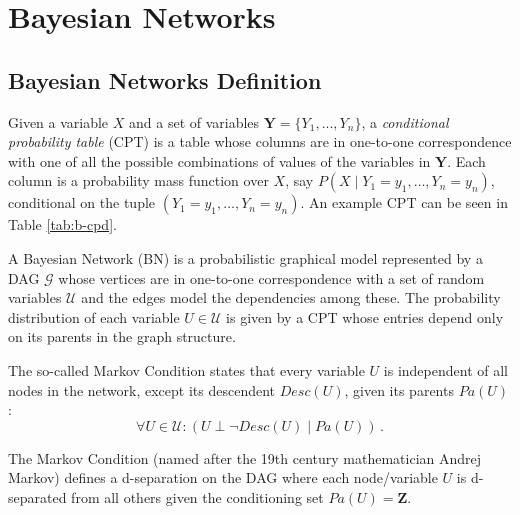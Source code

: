 \section{Bayesian Networks} \label{sec:bayesiannetworks}
\subsection{Bayesian Networks Definition}
Given a variable $X$ and a set of variables $\boldsymbol{Y} = \{Y_1, ..., Y_n\}$, a \textit{conditional probability table} (CPT) is a table whose columns are in one-to-one correspondence with one of all the possible combinations of values of the variables in $\boldsymbol{Y}$. 
Each column is a probability mass function over $X$, say $P(X \mid Y_1=y_1, \ldots ,Y_n=y_n)$, conditional on the tuple $(Y_1=y_1, \ldots ,Y_n=y_n)$.
An example CPT can be seen in Table \ref{tab:b-cpd}.

\begin{definition} \label{def:bayesian-network}
	A Bayesian Network (BN) is a probabilistic graphical model represented by a DAG $\mathcal{G}$ whose vertices are in one-to-one correspondence with a set of random variables $\mathcal{U}$ and the edges model the dependencies among these.
	The probability distribution of each variable $U \in \mathcal{U}$ is given by a CPT whose entries depend only on its parents in the graph structure.
	
	The so-called Markov Condition states that every variable $U$ is independent of all nodes in the network, except its descendent $Desc(U)$, given its parents $Pa(U)$:
	\begin{equation*}
		\forall U \in \mathcal{U}:  ( U \perp \neg Desc(U) \mid Pa(U)) \,.
	\end{equation*}
\end{definition}
The Markov Condition (named after the 19th century mathematician Andrej Markov) defines a d-separation on the DAG where each node/variable $U$ is d-separated from all others given the conditioning set $Pa(U) = \boldsymbol{Z}$.

